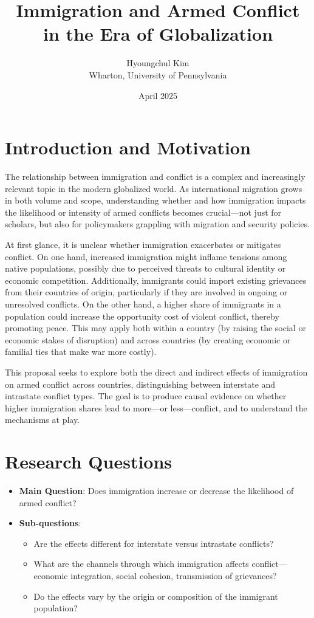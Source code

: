 \documentclass[12pt]{article}
\title{Immigration and Armed Conflict in the Era of Globalization}
\author{Hyoungchul Kim\\Wharton, University of Pennsylvania}
\date{April 2025}
\begin{document}
\maketitle
\onehalfspacing

\section*{Introduction and Motivation}

The relationship between immigration and conflict is a complex and increasingly relevant topic in the modern globalized world. As international migration grows in both volume and scope, understanding whether and how immigration impacts the likelihood or intensity of armed conflicts becomes crucial—not just for scholars, but also for policymakers grappling with migration and security policies.

At first glance, it is unclear whether immigration exacerbates or mitigates conflict. On one hand, increased immigration might inflame tensions among native populations, possibly due to perceived threats to cultural identity or economic competition. Additionally, immigrants could import existing grievances from their countries of origin, particularly if they are involved in ongoing or unresolved conflicts. On the other hand, a higher share of immigrants in a population could increase the opportunity cost of violent conflict, thereby promoting peace. This may apply both within a country (by raising the social or economic stakes of disruption) and across countries (by creating economic or familial ties that make war more costly).

This proposal seeks to explore both the direct and indirect effects of immigration on armed conflict across countries, distinguishing between interstate and intrastate conflict types. The goal is to produce causal evidence on whether higher immigration shares lead to more—or less—conflict, and to understand the mechanisms at play.

\section*{Research Questions}

\begin{itemize}
    \item \textbf{Main Question}: Does immigration increase or decrease the likelihood of armed conflict?
    \item \textbf{Sub-questions}:
    \begin{itemize}
        \item Are the effects different for interstate versus intrastate conflicts?
        \item What are the channels through which immigration affects conflict—economic integration, social cohesion, transmission of grievances?
        \item Do the effects vary by the origin or composition of the immigrant population?
    \end{itemize}
\end{itemize}
\end{document}
